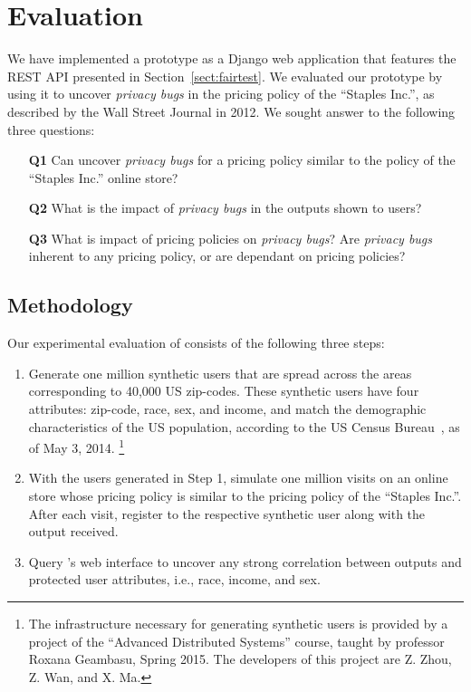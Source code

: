 \section{Evaluation}
\label{sect:evaluation}

We have implemented a \sysname prototype as a Django web application
that features the REST API presented in Section~\ref{sect:fairtest}.
We evaluated our prototype by using it to uncover {\it privacy bugs}
in the pricing policy of the ``Staples Inc.'', as described by the
Wall Street Journal in 2012. We sought answer to the following three
questions:

\begin{enumerate}
  \item[{\bf Q1}] Can \sysname uncover {\em privacy bugs} for
    a pricing policy similar to the policy of the ``Staples Inc.''
    online store?
  \item[{\bf Q2}] What is the impact of {\em privacy bugs} in the outputs
    shown to users?
  \item[{\bf Q3}] What is impact of pricing policies on {\em privacy bugs}?
    Are {\em privacy bugs} inherent to any pricing policy, or are
    dependant on pricing policies?
\end{enumerate}

\subsection{\normalsize Methodology}
Our experimental evaluation of \sysname consists of the following three steps:

\begin{enumerate}
  \item
  Generate one million synthetic users that are spread across the
  areas corresponding to 40,000 US zip-codes. These synthetic users
  have four attributes: zip-code, race, sex, and income, and match
  the demographic characteristics of the US population, according to
  the US Census Bureau~\cite{CensusBureau}, as of May 3, 2014.
  \footnote{
    The infrastructure necessary for generating synthetic users is
    provided by a project of the ``Advanced Distributed Systems'' course,
    taught by professor Roxana Geambasu, Spring 2015. The developers of this
    project are Z. Zhou, Z. Wan, and X. Ma.
  }

  \item
  With the users generated in Step 1, simulate one million visits on
  an online store whose pricing policy is similar to the pricing policy
  of the ``Staples Inc.''.
  After each visit, register to \sysname the respective synthetic user
  along with the output received.

  \item
  Query \sysname's web interface to uncover any strong correlation between
  outputs and protected user attributes, i.e., race, income, and sex.
\end{enumerate}

